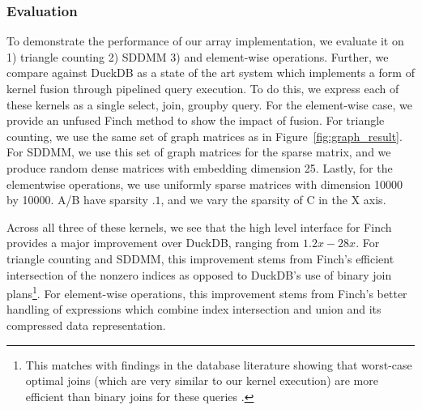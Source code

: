 \subsubsection{Evaluation}
To demonstrate the performance of our array implementation, we evaluate it on 1) triangle counting 2) SDDMM 3) and element-wise operations. Further, we compare against DuckDB as a state of the art system which implements a form of kernel fusion through pipelined query execution. To do this, we express each of these kernels as a single select, join, groupby query. For the element-wise case, we provide an unfused Finch method to show the impact of fusion. For triangle counting, we use the same set of graph matrices as in Figure~\ref{fig:graph_result}. For SDDMM, we use this set of graph matrices for the sparse matrix, and we produce random dense matrices with embedding dimension 25. Lastly, for the elementwise operations, we use uniformly sparse matrices with dimension 10000 by 10000. A/B have sparsity $.1$, and we vary the sparsity of C in the X axis.


Across all three of these kernels, we see that the high level interface for Finch provides a major improvement over DuckDB, ranging from $1.2x-28x$. For triangle counting and SDDMM, this improvement stems from Finch's efficient intersection of the nonzero indices as opposed to DuckDB's use of binary join plans\footnote{This matches with findings in the database literature showing that worst-case optimal joins (which are very similar to our kernel execution) are more efficient than binary joins for these queries \cite{wang_free_2023}.}. For element-wise operations, this improvement stems from Finch's better handling of expressions which combine index intersection and union and its compressed data representation.

